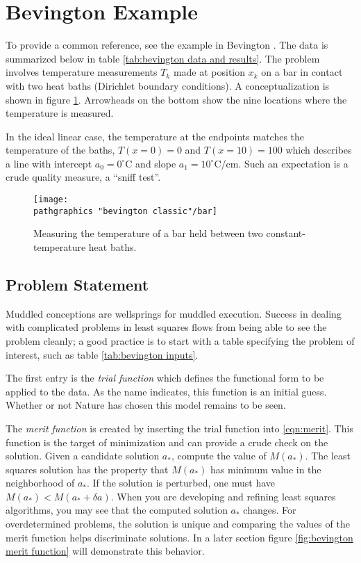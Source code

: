 \section{\label{sec:bevington example}Bevington Example}  %

To provide a common reference, see the example in Bevington \cite[ch 6]{Bevington}. The data is summarized below in table \ref{tab:bevington data and results}. The problem involves temperature measurements $T_{k}$ made at position $x_{k}$ on a bar in contact with two heat baths (Dirichlet boundary conditions). A conceptualization is shown in figure \ref{fig:bar}. Arrowheads on the bottom show the nine locations where the temperature is measured.

In the ideal linear case, the temperature at the endpoints matches the temperature of the baths, $T(x=0) = 0$ and $T(x = 10) = 100$ which describes a line with intercept $a_{0} = 0^{\circ}$C and slope $a_{1} = 10^{\circ}$C/cm. Such an expectation is a crude quality measure, a ``sniff test''.

\begin{figure}[htbp] %
   \centering
   \texttt{[image: \\pathgraphics "bevington classic"/bar]} 
   \caption[Measuring the temperature of a bar.]{Measuring the temperature of a bar held between two constant-temperature heat baths.}
   \label{fig:bar}
\end{figure}

\subsection{Problem Statement}  %
Muddled conceptions are wellsprings for muddled execution. Success in dealing with complicated problems in least squares flows from being able to see the problem cleanly; a good practice is to start with a table specifying the problem of interest, such as table \ref{tab:bevington inputs}.

The first entry is the \emph{trial function} which defines the functional form to be applied to the data. As the name indicates, this function is an initial guess. Whether or not Nature has chosen this model remains to be seen.

The \emph{merit function} is created by inserting the trial function into \eqref{eqn:merit}. This function is the target of minimization and can provide a crude check on the solution. Given a candidate solution $a_{*}$, compute the value of $M(a_{*})$. The least squares solution has the property that $M(a_{*})$ has minimum value in the neighborhood of $a_{*}$. If the solution is perturbed, one must have $M(a_{*}) < M(a_{*} + \delta a)$. When you are developing and refining least squares algorithms, you may see that the computed solution $a_{*}$ changes. For overdetermined problems, the solution is unique and comparing the values of the merit function helps discriminate solutions. In a later section figure \ref{fig:bevington merit function} will demonstrate this behavior.

